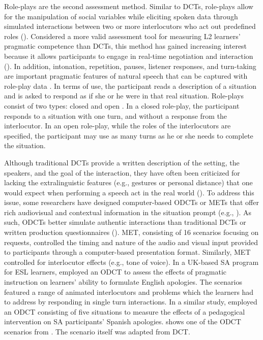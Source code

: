 \documentclass[output=paper]{langscibook}
\begin{document}
Role-plays are the second assessment method. Similar to DCTs, role-plays allow for the manipulation of social variables while eliciting spoken data through simulated interactions between two or more interlocutors who act out predefined roles (\citealt{Félix-Brasdefer2010,Félix-BrasdeferHasler-Barker2017,Kasper2000}). Considered a more valid assessment tool for measuring L2 learners’ pragmatic competence than DCTs, this method has gained increasing interest because it allows participants to engage in real-time negotiation and interaction (\citealt{Bataller2010,BatallerShively2011}). In addition, intonation, repetition, pauses, listener responses, and turn-taking are important pragmatic features of natural speech that can be captured with role-play data \citep{Turnbull2001}. In terms of use, the participant reads a description of a situation and is asked to respond as if she or he were in that real situation. Role-plays consist of two types: closed and open \citep{KasperDahl1991}. In a closed role-play, the participant responds to a situation with one turn, and without a response from the interlocutor. In an open role-play, while the roles of the interlocutors are specified, the participant may use as many turns as he or she needs to complete the situation.

Although traditional DCTs provide a written description of the setting, the speakers, and the goal of the interaction, they have often been criticized for lacking the extralinguistic features (e.g., gestures or personal distance) that one would expect when performing a speech act in the real world (\citealt{Félix-BrasdeferHasler-Barker2017,RockeyEtAl2020}). To address this issue, some researchers have designed computer-based ODCTs or METs that offer rich audiovisual and contextual information in the situation prompt (e.g., \citealt{CulpeperTaguchi2018,Félix-BrasdeferHasler-Barker2017,Schauer2004}). As such, ODCTs better simulate authentic interactions than traditional DCTs or written production questionnaires (\citealt{Félix-BrasdeferHasler-Barker2015,Halenko2018,Hernándezinpress,Ren2014,Ren2019,TaguchiLi2016}).  MET, consisting of 16 scenarios focusing on requests, controlled the timing and nature of the audio and visual input provided to participants through a computer-based presentation format. Similarly,  MET controlled for interlocutor effects (e.g., tone of voice). In a UK-based SA program for ESL learners, \citet{Halenko2018} employed an ODCT to assess the effects of pragmatic instruction on learners’ ability to formulate English apologies. The scenarios featured a range of animated interlocutors and problems which the learners had to address by responding in single turn interactions.  In a similar study, \citet{Hernándezinpress} employed an ODCT consisting of five situations to measure the effects of a pedagogical intervention on SA participants’ Spanish apologies.  shows one of the ODCT scenarios from \citet{Hernándezinpress}. The scenario itself was adapted from  DCT.
\end{document}
